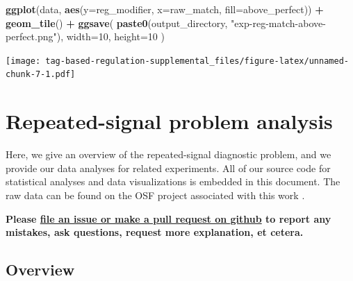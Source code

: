 \documentclass[
]{book}
\newenvironment{Shaded}{\begin{snugshade}}{\end{snugshade}}
\newcommand{\DataTypeTok}[1]{\textcolor[rgb]{0.13,0.29,0.53}{#1}}
\newcommand{\DecValTok}[1]{\textcolor[rgb]{0.00,0.00,0.81}{#1}}
\newcommand{\KeywordTok}[1]{\textcolor[rgb]{0.13,0.29,0.53}{\textbf{#1}}}
\newcommand{\NormalTok}[1]{#1}
\newcommand{\OperatorTok}[1]{\textcolor[rgb]{0.81,0.36,0.00}{\textbf{#1}}}
\newcommand{\StringTok}[1]{\textcolor[rgb]{0.31,0.60,0.02}{#1}}
\begin{document}
\begin{Shaded}
\begin{Highlighting}[]
\KeywordTok{ggplot}\NormalTok{(data, }\KeywordTok{aes}\NormalTok{(}\DataTypeTok{y=}\NormalTok{reg\_modifier, }\DataTypeTok{x=}\NormalTok{raw\_match, }\DataTypeTok{fill=}\NormalTok{above\_perfect)) }\OperatorTok{+}
\StringTok{  }\KeywordTok{geom\_tile}\NormalTok{() }\OperatorTok{+}
\StringTok{  }\KeywordTok{ggsave}\NormalTok{(}
    \KeywordTok{paste0}\NormalTok{(output\_directory, }\StringTok{"exp{-}reg{-}match{-}above{-}perfect.png"}\NormalTok{),}
    \DataTypeTok{width=}\DecValTok{10}\NormalTok{,}
    \DataTypeTok{height=}\DecValTok{10}
\NormalTok{  )}
\end{Highlighting}
\end{Shaded}

\texttt{[image: tag-based-regulation-supplemental\_files/figure-latex/unnamed-chunk-7-1.pdf]}

\hypertarget{repeated-signal-problem-analysis}{%
\chapter{Repeated-signal problem analysis}\label{repeated-signal-problem-analysis}}

Here, we give an overview of the repeated-signal diagnostic problem, and we provide our data analyses for related experiments.
All of our source code for statistical analyses and data visualizations is embedded in this document.
The raw data can be found on the OSF project associated with this work \citep{Lalejini_Moreno_Ofria_Data_2020}.

\textbf{Please \href{https://github.com/amlalejini/Tag-based-Genetic-Regulation-for-LinearGP/issues}{file an issue or make a pull request on github} to report any mistakes, ask questions, request more explanation, et cetera.}

\hypertarget{overview}{%
\section{Overview}\label{overview}}
\end{document}
